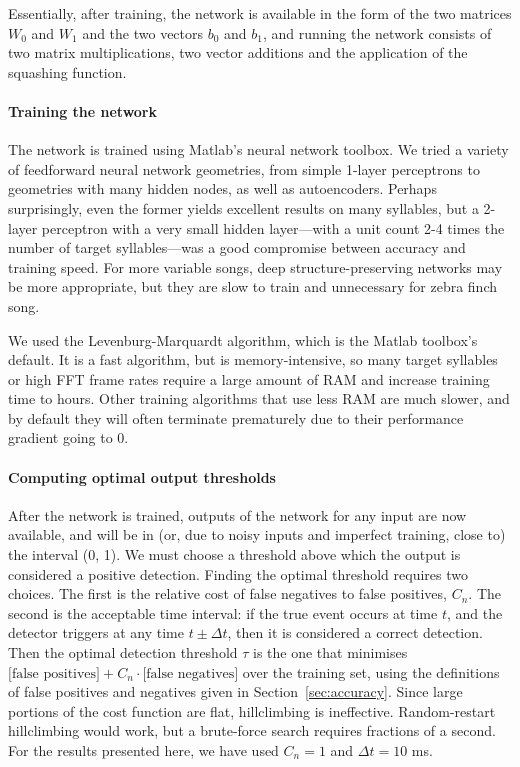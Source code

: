 \documentclass[10pt,letterpaper]{article}
\let\oldmarginpar\marginpar
\renewcommand{\marginpar}[1]{\oldmarginpar{\linespread{1}\scriptsize{#1}}}
\renewcommand{\subsubsection}[1]{\paragraph{#1}}
\begin{document}
Essentially, after training, the network is available in the form of the two matrices $W_0$ and $W_1$ and the two vectors $b_0$ and $b_1$, and running the network consists of two matrix multiplications, two vector additions and the application of the squashing function.\marginpar{I've left some other details.  Ok?}

\subsubsection{Training the network}

The network is trained using Matlab's neural network toolbox. We tried
a variety of feedforward neural network geometries, from simple
1-layer perceptrons to geometries with many hidden
nodes, as well as autoencoders. Perhaps surprisingly, even the former yields excellent results
on many syllables, but a 2-layer perceptron with a very small hidden
layer---with a unit count 2-4 times the number of target
syllables---was a good compromise between accuracy and training
speed. For more variable
songs, deep structure-preserving networks may be more appropriate, but
they are slow to train and unnecessary for zebra finch song.

We used the Levenburg-Marquardt
algorithm, which is the Matlab toolbox's default.  It is a fast algorithm, but is memory-intensive, so
many target syllables or high FFT frame rates require a large
amount of RAM and increase training time to hours. Other training
algorithms that use less RAM are much slower, and by default they will
often terminate prematurely due to their performance gradient
going to 0.

\subsubsection{Computing optimal output thresholds}
\label{sec:optimalthresholds}
After the network is trained, outputs of the network for any input
are now available, and will be in (or, due to noisy inputs and imperfect training, close to) the
interval (0, 1). We must choose a threshold above which the output is
considered a positive detection. Finding the optimal threshold
requires two choices. The first is the relative cost of false
negatives to false positives, $C_n$. The second is the acceptable time
interval: if the true event occurs at time $t$, and the detector
triggers at any time $t\pm\Delta t$, then it is considered a correct
detection. Then the optimal detection threshold $\tau$ is the one that
minimises $\textrm{[false positives]} +C_n\cdot\textrm{[false negatives]}$
over the training set, using the definitions of false positives and
negatives given in Section~\ref{sec:accuracy}. Since large
portions of the cost function are flat, hillclimbing is ineffective.  Random-restart hillclimbing
would work, but a brute-force search requires fractions of a
second. For the results presented here, we have used $C_n=1$ and $\Delta t=10$ ms.
\end{document}
